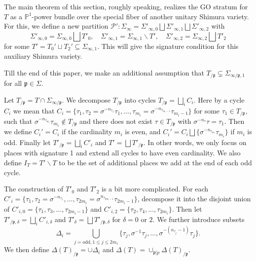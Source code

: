 \documentclass{article}
\begin{document}
The main theorem of this section, roughly speaking, realizes the GO stratum for $T$ as a $\mathbb{P}^1$-power bundle over the special fiber of another unitary Shimura variety. For this, we define a new partition
$\mathcal{P}':\Sigma_\infty=\Sigma'_{\infty,0}\bigsqcup\Sigma'_{\infty,1}\bigsqcup\Sigma'_{\infty,2}$ with
\begin{equation}
\Sigma'_{\infty,0}=\Sigma_{\infty,0}\bigsqcup T'_0,\quad \Sigma'_{\infty,1}=\Sigma_{\infty,1}\backslash T',\quad \Sigma'_{\infty,2}=\Sigma_{\infty,2}\bigsqcup T'_2
\end{equation}
for some $T'=T_0'\sqcup T_2'\subseteq\Sigma_{\infty,1}$. This will give the signature condition for this auxiliary Shimura variety.

\begin{assumption}
Till the end of this paper, we make an additional assumption that $T_{/\mathfrak{p}}\subsetneq \Sigma_{\infty/\mathfrak{p},1}$ for all $\mathfrak{p}\in\Sigma$.
\end{assumption}

Let $T_{/\mathfrak{p}}=T\cap \Sigma_{\infty/\mathfrak{p}}$. We decompose $T_{/\mathfrak{p}}$ into cycles $T_{/\mathfrak{p}}=\bigsqcup_{i} C_i$.
Here by a cycle $C_i$ we mean that $C_i=\{\tau_1,\tau_2=\sigma^{-n_{\tau_1}}\tau_1,\dots,\tau_{m_i}=\sigma^{-n_{\tau_{m_i-1}}}\tau_{m_i-1} \}$ for some $\tau_1\in T_{/\mathfrak{p}}$, such that $\sigma^{-n_{\tau_{m_i}}}\tau_{m_i}\notin T_{/\mathfrak{p}}$ and there does not exist $\tau\in T_{/\mathfrak{p}}$ with $\sigma^{-n_\tau}\tau=\tau_1$. Then we define $C_i'=C_i$ if the cardinality $m_i$ is even, and $C_i'=C_i\bigsqcup \{\sigma^{-n_{\tau_{m_i}}}\tau_{m_i}\}$ if $m_i$ is odd. Finally let $T'_{/\mathfrak{p}}=\bigsqcup_i C'_i$ and $T'=\bigsqcup T'_{/\mathfrak{p}}$. In other words, we only focus on places with signature 1 and extend all cycles to have even cardinality. We also define $I_T=T'\backslash T$ to be the set of additional places we add at the end of each odd cycle.

The construction of $T'_0$ and $T'_2$ is a bit more complicated. For each $C'_i=\{\tau_1,\tau_2=\sigma^{-n_{\tau_1}},\dots,\tau_{2m_i}=\sigma^{n_{\tau_{2m_i-1}}}\tau_{2m_i-1}\}$, decompose it into the disjoint union of $C'_{i,0}=\{\tau_1,\tau_3,\dots,\tau_{2m_i-1}\}$ and $C'_{i,2}=\{\tau_2,\tau_4,\dots,\tau_{2m_i}\}$. Then let $T'_{/\mathfrak{p},\delta}=\bigsqcup_iC'_{i,\delta}$ and $T'_\delta=\bigsqcup T'_{/\mathfrak{p},\delta}$ for $\delta=0$ or $2$. We further introduce subsets 
\begin{equation}
\Delta_i=\bigcup_{j=\text{odd},1\le j\le 2m_i}\{\tau_j,\sigma^{-1}\tau_j,\ldots,\sigma^{-(n_{\tau_j}-1)}\tau_j\}.
\end{equation}
We then define $\Delta(T)_{/\mathfrak{p}}=\cup \Delta_i$ and $\Delta(T)=\cup_{\mathfrak{p}|p}\Delta(T)_{/\mathfrak{p}}$.
\end{document}
